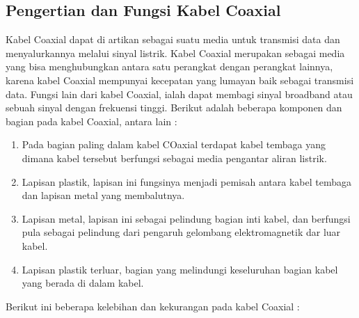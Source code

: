 

	\subsection{Pengertian dan Fungsi Kabel Coaxial}
	Kabel Coaxial dapat di artikan sebagai suatu media untuk transmisi data dan menyalurkannya melalui sinyal listrik. Kabel Coaxial merupakan sebagai media yang bisa menghubungkan antara satu perangkat dengan perangkat lainnya, karena kabel Coaxial mempunyai kecepatan yang lumayan baik sebagai transmisi data. Fungsi lain dari kabel Coaxial, ialah dapat membagi sinyal broadband atau sebuah sinyal dengan frekuensi tinggi. Berikut adalah beberapa komponen dan bagian pada kabel Coaxial, antara lain :
		\begin{enumerate}
			\item Pada bagian paling dalam kabel COaxial terdapat kabel tembaga yang dimana kabel tersebut berfungsi sebagai media pengantar aliran listrik.
			\item Lapisan plastik, lapisan ini fungsinya menjadi pemisah antara kabel tembaga dan lapisan metal yang membalutnya.
			\item Lapisan metal, lapisan ini sebagai pelindung bagian inti kabel, dan berfungsi pula sebagai pelindung dari pengaruh gelombang elektromagnetik dar luar kabel.
			\item Lapisan plastik terluar, bagian yang melindungi keseluruhan bagian kabel yang berada di dalam kabel.
		\end{enumerate}
	Berikut ini beberapa kelebihan dan kekurangan pada kabel Coaxial :
